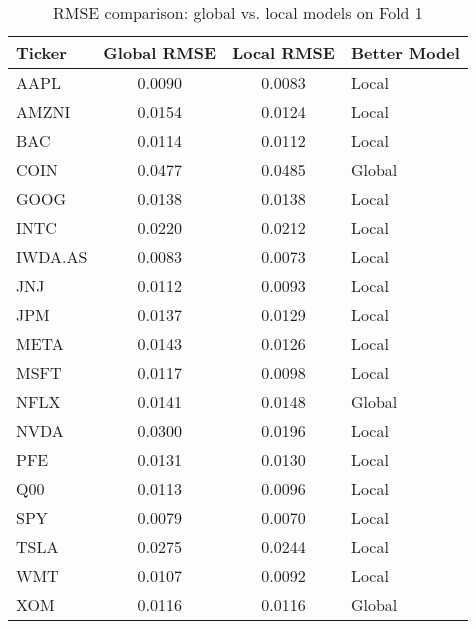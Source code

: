 \documentclass[12pt]{report}
\begin{document}
\begin{table}[ht]
\centering
\small
\begin{tabular}{|l|c|c|l|}
\hline
\textbf{Ticker} & \textbf{Global RMSE} & \textbf{Local RMSE} & \textbf{Better Model} \\
\hline
AAPL & 0.0090 & 0.0083 & Local \\
AMZNI & 0.0154 & 0.0124 & Local \\
BAC & 0.0114 & 0.0112 & Local \\
COIN & 0.0477 & 0.0485 & Global \\
GOOG & 0.0138 & 0.0138 & Local \\
INTC & 0.0220 & 0.0212 & Local \\
IWDA.AS & 0.0083 & 0.0073 & Local \\
JNJ & 0.0112 & 0.0093 & Local \\
JPM & 0.0137 & 0.0129 & Local \\
META & 0.0143 & 0.0126 & Local \\
MSFT & 0.0117 & 0.0098 & Local \\
NFLX & 0.0141 & 0.0148 & Global \\
NVDA & 0.0300 & 0.0196 & Local \\
PFE & 0.0131 & 0.0130 & Local \\
Q00 & 0.0113 & 0.0096 & Local \\
SPY & 0.0079 & 0.0070 & Local \\
TSLA & 0.0275 & 0.0244 & Local \\
WMT & 0.0107 & 0.0092 & Local \\
XOM & 0.0116 & 0.0116 & Global \\
\hline
\end{tabular}
\caption{RMSE comparison: global vs. local models on Fold 1}
\label{tab:rmse_fold1}
\end{table}
\end{document}
